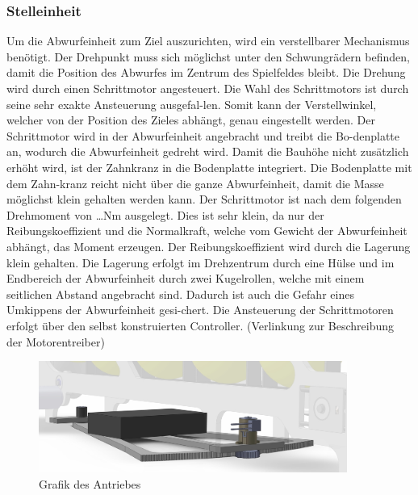 \subsubsection{Stelleinheit}
Um die Abwurfeinheit zum Ziel auszurichten, wird ein verstellbarer Mechanismus benötigt. Der Drehpunkt muss sich möglichst unter den Schwungrädern befinden, damit die Position des Abwurfes im Zentrum des Spielfeldes bleibt. Die Drehung wird durch einen Schrittmotor angesteuert. Die Wahl des Schrittmotors ist durch seine sehr exakte Ansteuerung ausgefal-len. Somit kann der Verstellwinkel, welcher von der Position des Zieles abhängt, genau eingestellt werden. Der Schrittmotor wird in der Abwurfeinheit angebracht und treibt die Bo-denplatte an, wodurch die Abwurfeinheit gedreht wird. Damit die Bauhöhe nicht zusätzlich erhöht wird, ist der Zahnkranz in die Bodenplatte integriert. Die Bodenplatte mit dem Zahn-kranz reicht nicht über die ganze Abwurfeinheit, damit die Masse möglichst klein gehalten werden kann. Der Schrittmotor ist nach dem folgenden Drehmoment von …Nm ausgelegt. Dies ist sehr klein, da nur der Reibungskoeffizient und die Normalkraft, welche vom Gewicht der Abwurfeinheit abhängt, das Moment erzeugen. Der Reibungskoeffizient wird durch die Lagerung klein gehalten. Die Lagerung erfolgt im Drehzentrum durch eine Hülse und im Endbereich der Abwurfeinheit durch zwei Kugelrollen, welche mit einem seitlichen Abstand angebracht sind. Dadurch ist auch die Gefahr eines Umkippens der Abwurfeinheit gesi-chert. Die Ansteuerung der Schrittmotoren erfolgt über den selbst konstruierten Controller. (Verlinkung zur Beschreibung der Motorentreiber)

\begin{figure}
	\centering
	\includegraphics[width=0.9\textwidth]{Enddokumentation/Loesungskonzept/Bilder/Stelleinheit.jpg}
	\caption{Grafik des Antriebes}
	\label{fig:Grafik des Antriebes}	
\end{figure}